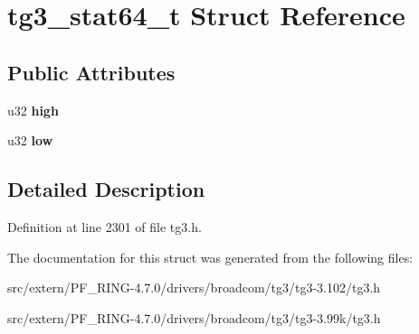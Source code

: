 \hypertarget{structtg3__stat64__t}{
\section{tg3\_\-stat64\_\-t Struct Reference}
\label{structtg3__stat64__t}
}
\subsection*{Public Attributes}
\begin{DoxyCompactItemize}
\item 
\hypertarget{structtg3__stat64__t_a4d4917e864d849761e055c0f4ddcde11}{
u32 {\bfseries high}}
\label{structtg3__stat64__t_a4d4917e864d849761e055c0f4ddcde11}

\item 
\hypertarget{structtg3__stat64__t_a99a2c627182e16b5e467454fd4cf4bb6}{
u32 {\bfseries low}}
\label{structtg3__stat64__t_a99a2c627182e16b5e467454fd4cf4bb6}

\end{DoxyCompactItemize}


\subsection{Detailed Description}


Definition at line 2301 of file tg3.h.



The documentation for this struct was generated from the following files:\begin{DoxyCompactItemize}
\item 
src/extern/PF\_\-RING-\/4.7.0/drivers/broadcom/tg3/tg3-\/3.102/tg3.h\item 
src/extern/PF\_\-RING-\/4.7.0/drivers/broadcom/tg3/tg3-\/3.99k/tg3.h\end{DoxyCompactItemize}
